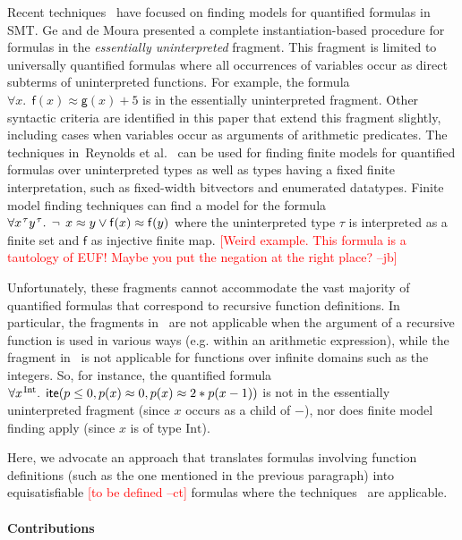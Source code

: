 \documentclass[runningheads,a4paper]{llncs}
\newcommand{\con}[1]{\mathsf{#1}}
\let\oldneg=\neg
\def\neg{\oldneg\:}
\newcommand{\teq}{\approx}
\newcommand{\sortint}{\mathrm{Int}}
\newcommand{\lite}{\con{ite}}
\newcommand{\rem}[1]{\textcolor{red}{[#1]}}
\newcommand{\jb}[1]{\rem{#1 --jb}}
\newcommand{\ct}[1]{\rem{#1 --ct}}
\newcommand{\vthinspace}{\kern+0.083333em}
\newcommand{\typ}[1]{^{\vthinspace #1}}
\begin{document}
Recent techniques~\cite{GeDeM-CAV-09, ReyEtAl-1-RR-13} 
have focused on finding models for quantified formulas in SMT.
Ge and de Moura \cite{GeDeM-CAV-09} presented a complete instantiation-based
procedure for formulas in the \emph{essentially uninterpreted} fragment.
This fragment is limited to universally quantified formulas where all
occurrences of variables occur as direct subterms of uninterpreted
functions. For example, the formula $\forall x%
.\;\, \con{f}( x )
\teq \con{g}( x ) + 5$ is in the essentially uninterpreted fragment.
Other syntactic criteria are identified in this paper that extend
this fragment slightly, including cases when variables occur as arguments of
arithmetic predicates. The techniques in~Reynolds et al.\
\cite{ReyEtAl-1-RR-13} can be used for finding finite models for quantified
formulas over uninterpreted types as well as types having a fixed finite
interpretation, such as fixed-width bitvectors and enumerated datatypes.
Finite model finding techniques can
find a model for the formula $\forall x\typ{\tau} y\typ{\tau}.\;\, \neg x \teq
y \vee \con{f}( x ) \teq \con{f}( y )$ where the uninterpreted type $\tau$ is
interpreted as a finite set and $\con{f}$ as injective finite map.
\jb{Weird example. This formula is a tautology of EUF! Maybe you put the
negation at the right place?}

Unfortunately, these fragments cannot accommodate the vast majority of
quantified formulas that correspond to recursive function definitions.
In particular, the fragments in~\cite{GeDeM-CAV-09} are not applicable when the argument of a recursive function is used in various ways (e.g. within an arithmetic expression), 
while the fragment in~\cite{ReyEtAl-1-RR-13} is not applicable for functions over infinite domains such as the integers.
So, for instance, the quantified formula $\forall x\typ{\sortint}.\;\, \lite( p \leq 0, p( x ) \teq 0, p( x ) \teq 2 * p( x - 1 ) )$ 
is not in the essentially uninterpreted fragment (since $x$ occurs as a child of $-$),
nor does finite model finding apply (since $x$ is of type $\sortint$).

Here, we advocate an approach that translates formulas involving function
definitions (such as the one mentioned in the previous paragraph)
into equisatisfiable \ct{to be defined} formulas where the
techniques~\cite{GeDeM-CAV-09, ReyEtAl-1-RR-13} are applicable.

\paragraph{Contributions}
\end{document}
